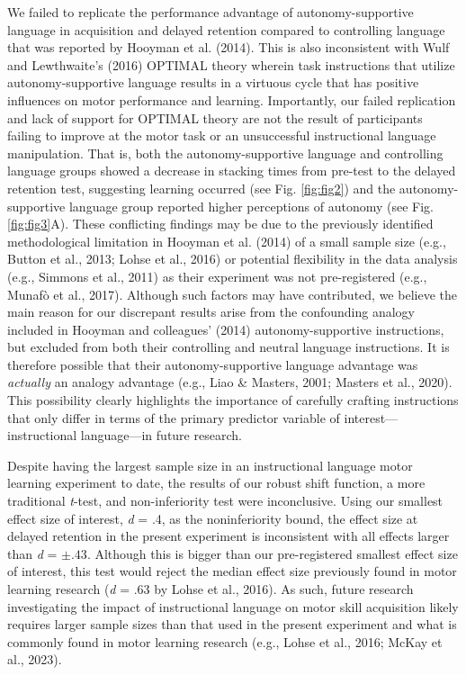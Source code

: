 \documentclass[
  doc, donotrepeattitle,floatsintext]{apa7}
\begin{document}
We failed to replicate the performance advantage of autonomy-supportive language in acquisition and delayed retention compared to controlling language that was reported by Hooyman et al. (2014). This is also inconsistent with Wulf and Lewthwaite's (2016) OPTIMAL theory wherein task instructions that utilize autonomy-supportive language results in a virtuous cycle that has positive influences on motor performance and learning. Importantly, our failed replication and lack of support for OPTIMAL theory are not the result of participants failing to improve at the motor task or an unsuccessful instructional language manipulation. That is, both the autonomy-supportive language and controlling language groups showed a decrease in stacking times from pre-test to the delayed retention test, suggesting learning occurred (see Fig. \ref{fig:fig2}) and the autonomy-supportive language group reported higher perceptions of autonomy (see Fig. \ref{fig:fig3}A). These conflicting findings may be due to the previously identified methodological limitation in Hooyman et al. (2014) of a small sample size (e.g., Button et al., 2013; Lohse et al., 2016) or potential flexibility in the data analysis (e.g., Simmons et al., 2011) as their experiment was not pre-registered (e.g., Munafò et al., 2017). Although such factors may have contributed, we believe the main reason for our discrepant results arise from the confounding analogy included in Hooyman and colleagues' (2014) autonomy-supportive instructions, but excluded from both their controlling and neutral language instructions. It is therefore possible that their autonomy-supportive language advantage was \emph{actually} an analogy advantage (e.g., Liao \& Masters, 2001; Masters et al., 2020). This possibility clearly highlights the importance of carefully crafting instructions that only differ in terms of the primary predictor variable of interest---instructional language---in future research.

Despite having the largest sample size in an instructional language motor learning experiment to date, the results of our robust shift function, a more traditional \emph{t}-test, and non-inferiority test were inconclusive. Using our smallest effect size of interest, \emph{d} = .4, as the noninferiority bound, the effect size at delayed retention in the present experiment is inconsistent with all effects larger than \emph{d} = \(\pm .43\). Although this is bigger than our pre-registered smallest effect size of interest, this test would reject the median effect size previously found in motor learning research (\emph{d} = .63 by Lohse et al., 2016). As such, future research investigating the impact of instructional language on motor skill acquisition likely requires larger sample sizes than that used in the present experiment and what is commonly found in motor learning research (e.g., Lohse et al., 2016; McKay et al., 2023).
\end{document}
